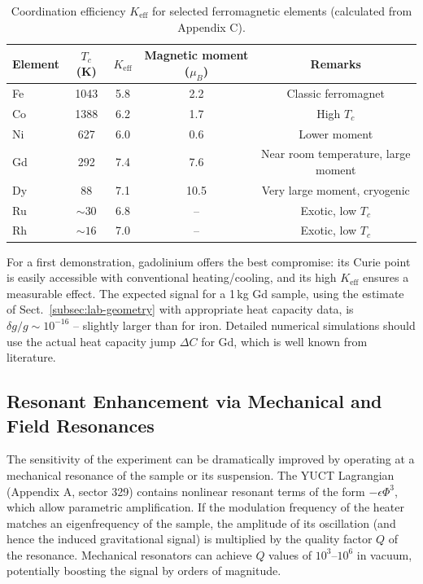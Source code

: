 \documentclass[12pt]{article}
\theoremstyle{remark}
\newcommand{\Keff}{K_{\mathrm{eff}}}
\begin{document}
	\begin{table}[htbp]
		\centering
		\caption{Coordination efficiency \(\Keff\) for selected ferromagnetic elements (calculated from Appendix C).}
		\label{tab:ferro-keff-appP}
		\begin{tabular}{lcccc}
			\toprule
			Element & \(T_c\) (K) & \(\Keff\) & Magnetic moment (\(\mu_B\)) & Remarks \\
			\midrule
			Fe & 1043 & 5.8 & 2.2 & Classic ferromagnet \\
			Co & 1388 & 6.2 & 1.7 & High \(T_c\) \\
			Ni & 627  & 6.0 & 0.6 & Lower moment \\
			Gd & 292  & 7.4 & 7.6 & Near room temperature, large moment \\
			Dy & 88   & 7.1 & 10.5 & Very large moment, cryogenic \\
			Ru & \(\sim 30\) & 6.8 & -- & Exotic, low \(T_c\) \\
			Rh & \(\sim 16\) & 7.0 & -- & Exotic, low \(T_c\) \\
			\bottomrule
		\end{tabular}
	\end{table}
	
	For a first demonstration, gadolinium offers the best compromise: its Curie point is easily accessible with conventional heating/cooling, and its high \(\Keff\) ensures a measurable effect. The expected signal for a 1\,kg Gd sample, using the estimate of Sect.~\ref{subsec:lab-geometry} with appropriate heat capacity data, is $\delta g/g \sim 10^{-16}$ -- slightly larger than for iron. Detailed numerical simulations should use the actual heat capacity jump \(\Delta C\) for Gd, which is well known from literature.
	
	\subsection{Resonant Enhancement via Mechanical and Field Resonances}
	\label{subsec:resonant-enhancement}
	
	The sensitivity of the experiment can be dramatically improved by operating at a mechanical resonance of the sample or its suspension. The YUCT Lagrangian (Appendix A, sector 329) contains nonlinear resonant terms of the form \(-\epsilon \Phi^3\), which allow parametric amplification. If the modulation frequency of the heater matches an eigenfrequency of the sample, the amplitude of its oscillation (and hence the induced gravitational signal) is multiplied by the quality factor \(Q\) of the resonance. Mechanical resonators can achieve \(Q\) values of \(10^3\)–\(10^6\) in vacuum, potentially boosting the signal by orders of magnitude.
	
\end{document}
